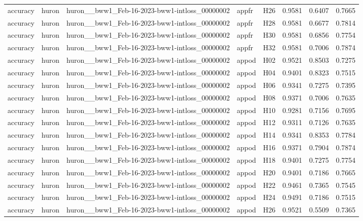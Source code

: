 \begin{table}[tbp]
\begin{tabular}{lllllrrr}
accuracy & huron & huron\_\_bww1\_Feb-16-2023-bww1-intloss\_00000002 & appfr & H26 & 0.9581 & 0.6407 & 0.7665 \\
accuracy & huron & huron\_\_bww1\_Feb-16-2023-bww1-intloss\_00000002 & appfr & H28 & 0.9581 & 0.6677 & 0.7814 \\
accuracy & huron & huron\_\_bww1\_Feb-16-2023-bww1-intloss\_00000002 & appfr & H30 & 0.9581 & 0.6856 & 0.7754 \\
accuracy & huron & huron\_\_bww1\_Feb-16-2023-bww1-intloss\_00000002 & appfr & H32 & 0.9581 & 0.7006 & 0.7874 \\
accuracy & huron & huron\_\_bww1\_Feb-16-2023-bww1-intloss\_00000002 & appod & H02 & 0.9521 & 0.8503 & 0.7275 \\
accuracy & huron & huron\_\_bww1\_Feb-16-2023-bww1-intloss\_00000002 & appod & H04 & 0.9401 & 0.8323 & 0.7515 \\
accuracy & huron & huron\_\_bww1\_Feb-16-2023-bww1-intloss\_00000002 & appod & H06 & 0.9341 & 0.7275 & 0.7395 \\
accuracy & huron & huron\_\_bww1\_Feb-16-2023-bww1-intloss\_00000002 & appod & H08 & 0.9371 & 0.7006 & 0.7635 \\
accuracy & huron & huron\_\_bww1\_Feb-16-2023-bww1-intloss\_00000002 & appod & H10 & 0.9281 & 0.7156 & 0.7695 \\
accuracy & huron & huron\_\_bww1\_Feb-16-2023-bww1-intloss\_00000002 & appod & H12 & 0.9311 & 0.7126 & 0.7635 \\
accuracy & huron & huron\_\_bww1\_Feb-16-2023-bww1-intloss\_00000002 & appod & H14 & 0.9341 & 0.8353 & 0.7784 \\
accuracy & huron & huron\_\_bww1\_Feb-16-2023-bww1-intloss\_00000002 & appod & H16 & 0.9371 & 0.7904 & 0.7874 \\
accuracy & huron & huron\_\_bww1\_Feb-16-2023-bww1-intloss\_00000002 & appod & H18 & 0.9401 & 0.7275 & 0.7754 \\
accuracy & huron & huron\_\_bww1\_Feb-16-2023-bww1-intloss\_00000002 & appod & H20 & 0.9401 & 0.7186 & 0.7665 \\
accuracy & huron & huron\_\_bww1\_Feb-16-2023-bww1-intloss\_00000002 & appod & H22 & 0.9461 & 0.7365 & 0.7545 \\
accuracy & huron & huron\_\_bww1\_Feb-16-2023-bww1-intloss\_00000002 & appod & H24 & 0.9491 & 0.7186 & 0.7515 \\
accuracy & huron & huron\_\_bww1\_Feb-16-2023-bww1-intloss\_00000002 & appod & H26 & 0.9521 & 0.5509 & 0.7365 \\

\end{tabular}
\end{table}
